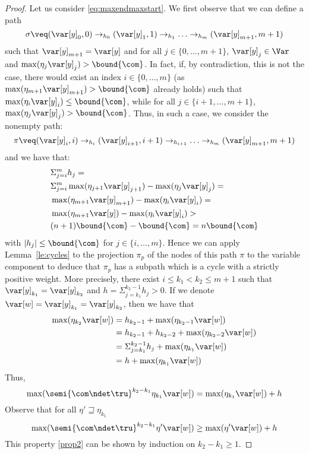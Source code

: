 \begin{proof}
  Let us consider \eqref{eq:maxendmaxstart}. We first observe that we
  can define a path
  \begin{equation}
    \label{eq:fix}
    \sigma \veq (\var[y]_0, 0) \to_{h_0} (\var[y]_1, 1) \to_{h_1}
    \ldots \to_{h_m} (\var[y]_{m+1}, m+1)
  \end{equation}
  such that \(\var[y]_{m+1}=\var[y]\) and for all \(j \in \{0,\ldots, m+1\}\), 
  \(\var[y]_j\in \Var\)  and
  \(\max(\eta_{j} \var[y]_{j}) > \bound{\com}\).
  In fact, if, by contradiction, this is not the case, there would
  exist an index \(i \in \{0,\ldots, m\}\) (as
  \(\max(\eta_{m+1} \var[y]_{m+1}) > \bound{\com}\) already holds)
  such that \(\max(\eta_{i} \var[y]_{i}) \leq \bound{\com}\), while
  for all \(j \in \{i+1,\ldots, m+1\}\),
  \(\max(\eta_{j} \var[y]_j) > \bound{\com}\).  Thus, in such a case,
  we consider the nonempty path:
  \[\pi \veq (\var[y]_i, i) \to_{h_i} (\var[y]_{i+1}, i+1) \to_{h_{i+1}} \ldots
  \to_{h_m} (\var[y]_{m+1}, m+1)\]
  and we have that:
  \begin{align*}
    &\Sigma_{j=i}^m h_j =\\ 
    &\Sigma_{j=i}^m \max(\eta_{j+1} \var[y]_{j+1}) - \max(\eta_j \var[y]_{j}) =\\
    &\max(\eta_{m+1} \var[y]_{m+1}) - \max(\eta_i \var[y]_{i}) =\\
    &\max(\eta_{m+1} \var[y]) - \max(\eta_i \var[y]_{i})>\\
    &  (n+1) \bound{\com} - \bound{\com} = n \bound{\com}
  \end{align*}
  with \(|h_j| \leq \bound{\com}\) for \(j \in \{i,\ldots,
  m\}\). Hence we can apply Lemma~\ref{le:cycles} to the projection
  \(\pi_p\) of the nodes of this path \(\pi\) to the variable
  component to deduce that \(\pi_p\) has a subpath which is a cycle
  with a strictly positive weight.  More precisely, there exist
  \(i \leq k_1 < k_2 \leq m+1\) such that
  \(\var[y]_{k_1} = \var[y]_{k_2}\) and
  \(h = \Sigma_{j=k_1}^{k_2-1} h_j > 0\). If we denote
  \(\var[w] = \var[y]_{k_1} = \var[y]_{k_2}\), then we have that
  \begin{align*}
    \max(\eta_{k_2} \var[w]) & =  h_{k_2-1}  + \max(\eta_{k_2-1} \var[w]) \\
                             & =  h_{k_2-1} + h_{k_2-2} + \max(\eta_{k_2-2} \var[w])  \\
                             & = \Sigma_{j=k_1}^{k_2-1} h_j + \max(\eta_{k_1} \var[w])  \\
                             & = h +  \max(\eta_{k_1} \var[w])  
  \end{align*}
  Thus,
  \[\max(\semi{\com \ndet \tru}^{k_2-k_1} \eta_{k_1} \var[w]) = \max(\eta_{k_1}
  \var[w]) + h\] 
  Observe that for all \(\eta' \sqsupseteq \eta_{k_1}\)
  \begin{equation}\label{prop2}
    \max(\semi{\com \ndet \tru}^{k_2-k_1} \eta' \var[w]) \geq \max(\eta'
    \var[w]) + h
  \end{equation}
  This property \eqref{prop2} can be shown by induction on \(k_2-k_1 \geq 1\).
  

\end{proof}
